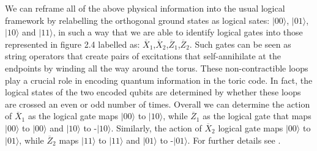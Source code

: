 \documentclass{Configuration_Files/PoliMi3i_thesis}
\begin{document}
We can reframe all of the above physical information into the usual logical framework by relabelling the orthogonal ground states as logical sates: $|00\rangle$, $|01\rangle$, $|10\rangle$ and $|11\rangle$, in such a way that we are able to identify logical gates into those represented in figure 2.4 labelled as: $\overline{X}_1$,$\overline{X}_2$,$\overline{Z}_1$,$\overline{Z}_2$. \newline 
Such gates can be seen as string operators that create pairs of excitations that self-annihilate at the endpoints by winding all the way around the torus. 
These non-contractible loops play a crucial role in encoding quantum information in the toric code. In fact, the logical states of the two encoded qubits are determined by whether these loops are crossed an even or odd number of times. \newline
Overall we can determine the action of $\overline{X}_1$ as the logical gate maps $|00\rangle$ to $|10\rangle$, while $\overline{Z}_1$ as the logical gate that maps $|00\rangle$ to $|00\rangle$ and $|10\rangle$ to -$|10\rangle$. \newline
Similarly, the action of $\overline{X}_2$ logical gate maps $|00\rangle$ to $|01\rangle$, while $\overline{Z}_2$ maps $|11\rangle$ to $|11\rangle$ and $|01\rangle$ to -$|01\rangle$. For further details see \cite{Her20}.\newline
\end{document}
